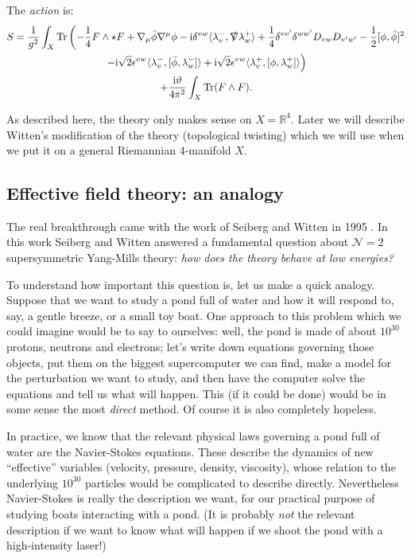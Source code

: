 \documentclass[12pt,letterpaper,reqno]{article}
\numberwithin{equation}{section}
\newcommand{\cN}{\ensuremath{\mathcal N}}
\newcommand{\R}{\ensuremath{\mathbb R}}
\newcommand{\half}{\ensuremath{\frac{1}{2}}}
\newcommand{\I}{{\mathrm i}}
\newcommand{\IP}[1]{\langle#1\rangle}
\newcommand{\eps}{\epsilon}
\newcommand{\ti}[1]{\textit{#1}}
\DeclareMathOperator{\Tr}{Tr}
\newcommand{\fixme}[1]{{\color{orange}{[#1]}}}
\begin{document}
The \ti{action} is: \fixme{explain notation $v$, $w$ and inner product $\IP{,}$, and double-check factors}
\begin{multline} \label{eq:n=2sym-action}
 S = \frac{1}{g^2} \int_X \Tr\left( - \frac14 F \wedge \star F + \nabla_\mu \bar\phi \nabla^\mu \phi - \I \delta^{vw} \IP{\lambda_v^-, \slashed\nabla \lambda_w^+} + \frac14 \delta^{vv'} \delta^{ww'} D_{vw} D_{v'w'} - \half [\phi, \bar\phi]^2 \right. \\ \left. - \I \sqrt{2} \eps^{vw} \IP{\lambda_v^-, [\bar\phi, \lambda_w^-]} + \I \sqrt{2} \eps^{vw} \IP{\lambda_v^+, [\phi,\lambda_w^+]} \right) \\ + \frac{\I \vartheta}{4\pi^2} \int_X \Tr (F \wedge F).
\end{multline}

As described here, the theory only makes sense on $X = \R^4$.
Later we will describe Witten's modification of the
theory (topological twisting)
which we will use when we put it on a general Riemannian $4$-manifold $X$.

\subsection{Effective field theory: an analogy}

The real breakthrough came with the work of Seiberg and Witten
in 1995 \cite{Seiberg:1994rs}.
In this work Seiberg and Witten answered a fundamental
question about $\cN=2$ supersymmetric Yang-Mills theory:
\ti{how does the theory behave at low energies?}

To understand how important this question is, let us make a quick
analogy. Suppose that we want to study a pond full of water and how
it will respond to, say, a gentle breeze, or a small toy boat.
One approach to this problem which we could imagine would be to say
to ourselves: well, the pond is made of about $10^{30}$ protons,
neutrons and electrons; let's write down equations governing those objects,
put them on the biggest supercomputer we can find, make a model for the
perturbation we want to study, and then have the computer solve the
equations and tell us what will happen. This (if it could be done)
would be in some sense the most \ti{direct} method.
Of course it is also completely hopeless.

In practice, we know that the relevant physical laws
governing a pond full of water are the Navier-Stokes equations. These
describe the dynamics of new ``effective''
variables (velocity, pressure, density, viscosity), whose relation
to the underlying $10^{30}$ particles would be complicated
to describe directly. Nevertheless Navier-Stokes is really the
description we want, for our practical purpose of studying boats
interacting with a pond. (It is probably \ti{not} the
relevant description if we want to know what will happen if we shoot the
pond with a high-intensity laser!)
\end{document}

